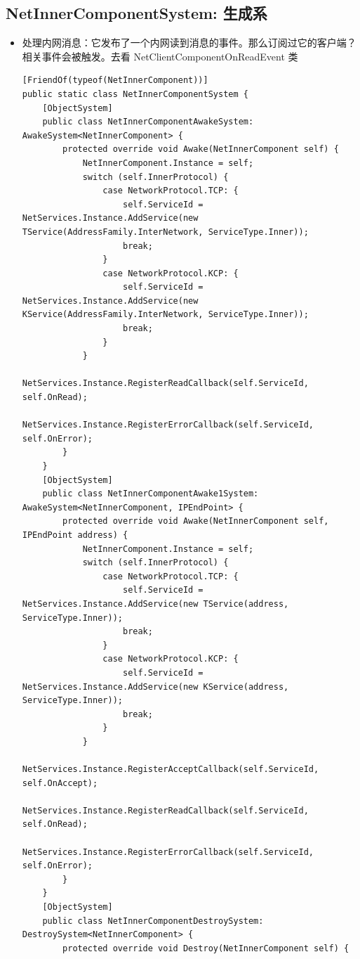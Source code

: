 \documentclass[9pt, b5paper]{article}
\begin{document}
\subsection{NetInnerComponentSystem: 生成系}
\label{sec-3-11}
\begin{itemize}
\item 处理内网消息：它发布了一个内网读到消息的事件。那么订阅过它的客户端？相关事件会被触发。去看 NetClientComponentOnReadEvent 类
\begin{verbatim}
[FriendOf(typeof(NetInnerComponent))]
public static class NetInnerComponentSystem {
    [ObjectSystem]
    public class NetInnerComponentAwakeSystem: AwakeSystem<NetInnerComponent> {
        protected override void Awake(NetInnerComponent self) {
            NetInnerComponent.Instance = self;
            switch (self.InnerProtocol) {
                case NetworkProtocol.TCP: {
                    self.ServiceId = NetServices.Instance.AddService(new TService(AddressFamily.InterNetwork, ServiceType.Inner));
                    break;
                }
                case NetworkProtocol.KCP: {
                    self.ServiceId = NetServices.Instance.AddService(new KService(AddressFamily.InterNetwork, ServiceType.Inner));
                    break;
                }
            }
            NetServices.Instance.RegisterReadCallback(self.ServiceId, self.OnRead);
            NetServices.Instance.RegisterErrorCallback(self.ServiceId, self.OnError);
        }
    }
    [ObjectSystem]
    public class NetInnerComponentAwake1System: AwakeSystem<NetInnerComponent, IPEndPoint> {
        protected override void Awake(NetInnerComponent self, IPEndPoint address) {
            NetInnerComponent.Instance = self;
            switch (self.InnerProtocol) {
                case NetworkProtocol.TCP: {
                    self.ServiceId = NetServices.Instance.AddService(new TService(address, ServiceType.Inner));
                    break;
                }
                case NetworkProtocol.KCP: {
                    self.ServiceId = NetServices.Instance.AddService(new KService(address, ServiceType.Inner));
                    break;
                }
            }
            NetServices.Instance.RegisterAcceptCallback(self.ServiceId, self.OnAccept);
            NetServices.Instance.RegisterReadCallback(self.ServiceId, self.OnRead);
            NetServices.Instance.RegisterErrorCallback(self.ServiceId, self.OnError);
        }
    }
    [ObjectSystem]
    public class NetInnerComponentDestroySystem: DestroySystem<NetInnerComponent> {
        protected override void Destroy(NetInnerComponent self) {

\end{verbatim}
\end{itemize}
\end{document}
